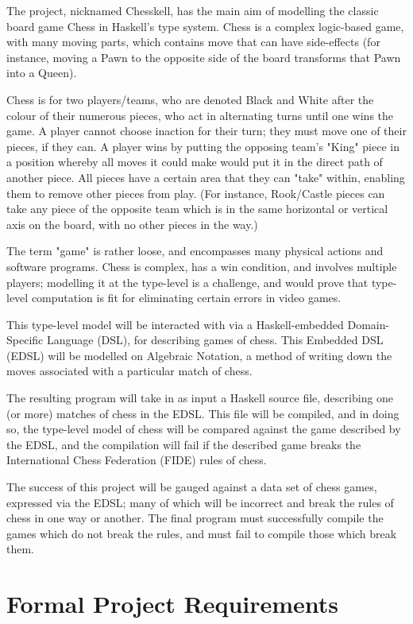 \documentclass[12pt, a4paper]{scrartcl}
\begin{document}
The project, nicknamed Chesskell, has the main aim of modelling the classic board game Chess in Haskell's type system. Chess is a complex logic-based game, with many moving parts, which contains move that can have side-effects (for instance, moving a Pawn to the opposite side of the board transforms that Pawn into a Queen).

Chess is for two players/teams, who are denoted Black and White after the colour of their numerous pieces, who act in alternating turns until one wins the game. A player cannot choose inaction for their turn; they must move one of their pieces, if they can. A player wins by putting the opposing team's "King" piece in a position whereby all moves it could make would put it in the direct path of another piece. All pieces have a certain area that they can "take" within, enabling them to remove other pieces from play. (For instance, Rook/Castle pieces can take any piece of the opposite team which is in the same horizontal or vertical axis on the board, with no other pieces in the way.)

The term "game" is rather loose, and encompasses many physical actions and software programs. Chess is complex, has a win condition, and involves multiple players; modelling it at the type-level is a challenge, and would prove that type-level computation is fit for eliminating certain errors in video games.

This type-level model will be interacted with via a Haskell-embedded Domain-Specific Language (DSL), for describing games of chess. This Embedded DSL (EDSL) will be modelled on Algebraic Notation, a method of writing down the moves associated with a particular match of chess.

The resulting program will take in as input a Haskell source file, describing one (or more) matches of chess in the EDSL. This file will be compiled, and in doing so, the type-level model of chess will be compared against the game described by the EDSL, and the compilation will fail if the described game breaks the International Chess Federation (FIDE) rules of chess.

The success of this project will be gauged against a data set of chess games, expressed via the EDSL; many of which will be incorrect and break the rules of chess in one way or another. The final program must successfully compile the games which do not break the rules, and must fail to compile those which break them.

\section{Formal Project Requirements}
\end{document}
